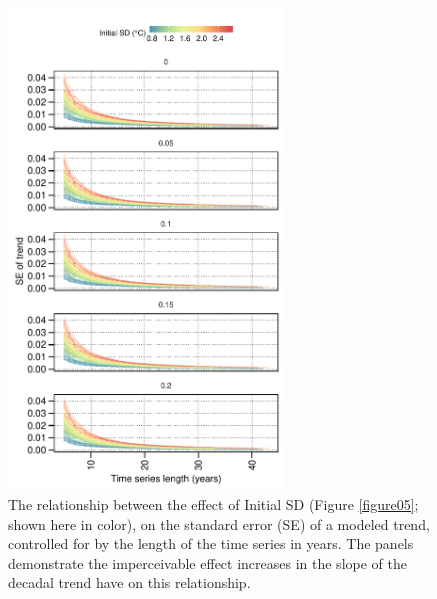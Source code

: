 \documentclass[]{ametsoc}
\begin{document}
\begin{figure}
\centering \includegraphics[width=0.65\textwidth]{figure06}
\caption[\small The relationship between the effect of Initial SD (Figure \ref{figure05}) on the SE of a modeled trend]{The relationship between the effect of Initial SD (Figure \ref{figure05}; shown here in color), on the standard error (SE) of a modeled trend, controlled for by the length of the time series in years. The panels demonstrate the imperceivable effect increases in the slope of the decadal trend have on this relationship.}
\label{figure06}
\end{figure}
\end{document}
